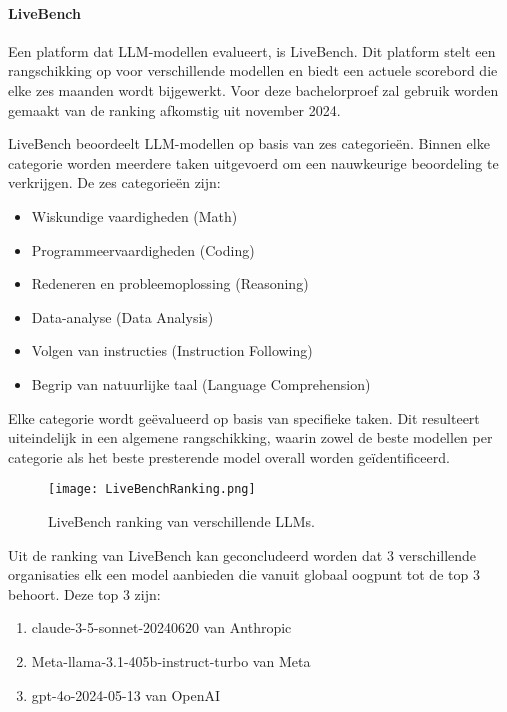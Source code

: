     \paragraph{LiveBench} 
    Een platform dat LLM-modellen evalueert, is LiveBench. Dit platform stelt een rangschikking op voor verschillende modellen en biedt een actuele scorebord die elke zes maanden wordt bijgewerkt. Voor deze bachelorproef zal gebruik worden gemaakt van de ranking afkomstig uit november 2024.
    
    LiveBench beoordeelt LLM-modellen op basis van zes categorieën. Binnen elke categorie worden meerdere taken uitgevoerd om een nauwkeurige beoordeling te verkrijgen. De zes categorieën zijn:
    \begin{itemize}
        \item Wiskundige vaardigheden (Math)
        \item Programmeervaardigheden (Coding)
        \item Redeneren en probleemoplossing (Reasoning)
        \item Data-analyse (Data Analysis)
        \item Volgen van instructies (Instruction Following)
        \item Begrip van natuurlijke taal (Language Comprehension)
    \end{itemize}
    
    Elke categorie wordt geëvalueerd op basis van specifieke taken. Dit resulteert uiteindelijk in een algemene rangschikking, waarin zowel de beste modellen per categorie als het beste presterende model overall worden geïdentificeerd.
    
    \begin{figure}[H]
        \centering
        \texttt{[image: LiveBenchRanking.png]}
        \caption{LiveBench ranking van verschillende LLMs.}
        \label{fig:livebench}
    \end{figure}
    
    Uit de ranking van LiveBench kan geconcludeerd worden dat 3 verschillende organisaties elk een model aanbieden die vanuit globaal oogpunt tot de top 3 behoort. Deze top 3 zijn: 
    \begin{enumerate}
        \item claude-3-5-sonnet-20240620 van Anthropic
        \item Meta-llama-3.1-405b-instruct-turbo van Meta
        \item gpt-4o-2024-05-13 van OpenAI
    \end{enumerate}
    
